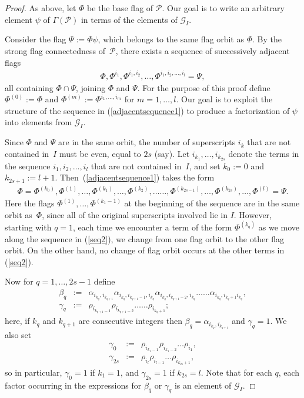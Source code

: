 \documentclass[12pt]{article}
\renewcommand{\>}{\rangle}
\theoremstyle{definition}\newtheorem{definition}{Definition}[section]
\begin{document}
\begin{proof}
As above, let $\Phi$ be the base flag of $\mathcal{P}$. Our goal is to write an arbitrary element $\psi$ of $\Gamma(\mathcal{P})$ in terms of the elements of $\mathcal{G}_{I}$. 

Consider the flag $\Psi:=\Phi\psi$, which belongs to the same flag orbit as $\Phi$. By the strong flag connectedness of~$\mathcal{P}$, there exists a sequence of successively adjacent flags 
\begin{eqnarray}
\label{adjacentsequence1}
\Phi, \Phi^{i_1}, \Phi^{i_1, i_2}, \dots, \Phi^{i_1, i_2, \dots, i_l}=\Psi,
\end{eqnarray}
all containing $\Phi \cap \Psi$, joining $\Phi$ and $\Psi$.  For the purpose of this proof define $\Phi^{(0)}:=\Phi$ and $\Phi^{(m)}:= \Phi^{i_1,\dots, i_m}$ for $m=1,\ldots,l$. Our goal is to exploit the structure of the sequence in (\ref{adjacentsequence1}) to produce a factorization of $\psi$ into elements from $\mathcal{G}_{I}$.
 
Since $\Phi$ and $\Psi$ are in the same orbit, the number of superscripts $i_k$ that are not contained in~$I$ must be even, equal to $2s$ (say). Let $i_{k_1}, \ldots, i_{k_{2s}}$ denote the terms in the sequence $i_1, i_2, \ldots, i_l$ that are not contained in~$I$, and set $k_0:=0$ and $k_{2s+1}:=l+1$. Then~(\ref{adjacentsequence1}) takes the form
\begin{eqnarray}
\label{seq2}
\Phi=\Phi^{(k_0)},  \Phi^{(1)}, \dots,  \Phi^{(k_1)},\ldots, \Phi^{(k_2)}, \ldots\ldots, \Phi^{(k_{2s-1})}, \ldots, \Phi^{(k_{2s})}, \ldots, \Phi^{(l)} = \Psi.
\end{eqnarray}
Here the flags $\Phi^{(1)}, \ldots, \Phi^{(k_1-1)}$ at the beginning of the sequence are in the same orbit as~$\Phi$, since all of the original superscripts involved lie in $I$. However, starting with $q=1$, each time we encounter a term of the form $\Phi^{(k_q)}$ as we move along the sequence in (\ref{seq2}), we change from one flag orbit to the other flag orbit. On the other hand, no change of flag orbit occurs at the other terms in (\ref{seq2}).

Now for $q=1, \dots, 2s-1$ define 
\begin{eqnarray*}
\beta_q&\!:=\!&\alpha_{i_{k_q},i_{k_{q+1}}} \alpha_{i_{k_q}, i_{k_{q+1}-1}, i_{k_q}} \alpha_{i_{k_q}, i_{k_{q+1}-2}, i_{k_q}} \ldots\ldots \alpha_{i_{k_q}, i_{k_q+1} i_{k_q}}, \\
\gamma_q&\!:=\!& \rho_{i_{k_{q+1}-1}} \rho_{i_{k_{q+1}-2}} \ldots\ldots \rho_{i_{k_q+1}};
\end{eqnarray*}
here, if $k_q$ and $k_{q+1}$ are consecutive integers then $\beta_{q}=\alpha_{i_{k_q},i_{k_{q+1}}}$ and $\gamma_{q}=1$. We also set
\begin{eqnarray*}
\gamma_{0}   &\!:=\!& \rho_{i_{k_{1}-1}} \rho_{i_{k_{1}-2}} \ldots \rho_{i_1},\\
\gamma_{2s} &\!:=\!& \rho_{i_l} \rho_{i_{l-1}} \dots \rho_{i_{k_{2s}+1}} ,
\end{eqnarray*}
so in particular, $\gamma_{0}=1$ if $k_{1}=1$, and $\gamma_{2s}=1$ if $k_{2s}=l$.
Note that for each $q$, each factor occurring in the expressions for $\beta_q$ or $\gamma_q$ is an element of $\mathcal{G}_{I}$. 


\end{proof}
\end{document}
